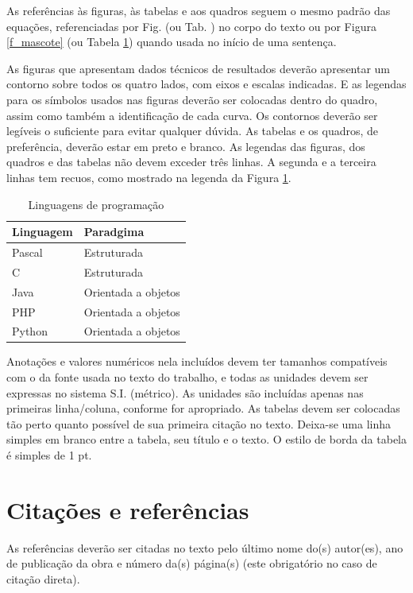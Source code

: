 \documentclass[12pt]{article}
\begin{document}
As referências às figuras, às tabelas e aos quadros seguem o mesmo padrão das equações, referenciadas por Fig. (ou Tab. ) no corpo do texto ou por Figura \ref{f_mascote} (ou Tabela \ref{t_linguagens}) quando usada no início de uma sentença. 

As figuras que apresentam dados técnicos de resultados deverão apresentar um contorno sobre todos os quatro lados, com eixos e escalas indicadas. E as legendas para os símbolos usados nas figuras deverão ser colocadas dentro do quadro, assim como também a identificação de cada curva. Os contornos deverão ser legíveis o suficiente para evitar qualquer dúvida. 
As tabelas e os quadros, de preferência, deverão estar em preto e branco. As legendas das figuras, dos quadros e das tabelas não devem exceder três linhas. A segunda e a terceira linhas tem recuos, como mostrado na legenda da Figura \ref{t_linguagens}.

\begin{table}[!htbp]
\caption{Linguagens de programação}
\label{t_linguagens}
\begin{center}
\begin{tabular}{|l|l|}  \hline
Linguagem & Paradgima \\ \hline \hline
Pascal & Estruturada \\ \hline
C & Estruturada \\ \hline
Java & Orientada a objetos \\ \hline
PHP & Orientada a objetos \\ \hline
Python & Orientada a objetos \\ \hline
\end{tabular}
\end{center}
\end{table}


Anotações e valores numéricos nela incluídos devem ter tamanhos compatíveis com o da fonte usada no texto do trabalho, e todas as unidades devem ser expressas no sistema S.I. (métrico). As unidades são incluídas apenas nas primeiras linha/coluna, conforme for apropriado. As tabelas devem ser colocadas tão perto quanto possível de sua primeira citação no texto. Deixa-se uma linha simples em branco entre a tabela, seu título e o texto. O estilo de borda da tabela é simples de 1 pt. 

\section{Citações e referências}

As referências deverão ser citadas no texto pelo último nome do(s) autor(es), ano de publicação da obra e número da(s) página(s) (este obrigatório no caso de citação direta).  
\end{document}
